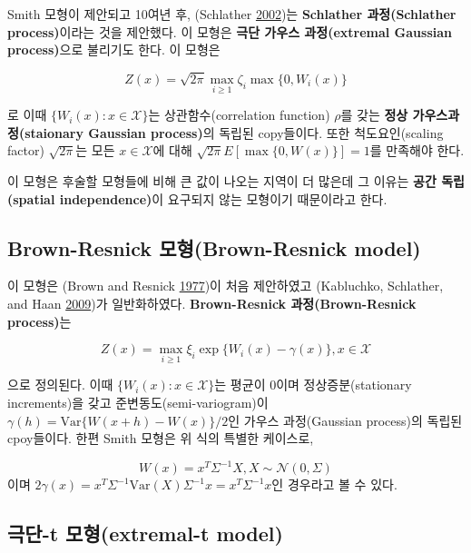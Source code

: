 \documentclass[b5paper,]{book}
\theoremstyle{definition}
\theoremstyle{definition}
\theoremstyle{definition}
\theoremstyle{remark}
\begin{document}
Smith 모형이 제안되고 10여년 후, (Schlather
\protect\hyperlink{ref-Schlather2002}{2002})는 \textbf{Schlather
과정(Schlather process)}이라는 것을 제안했다. 이 모형은 \textbf{극단
가우스 과정(extremal Gaussian process)}으로 불리기도 한다. 이 모형은

\begin{equation}
Z(x)=\sqrt{2\pi}\max_{i\geq 1}\zeta_{i}\max\{0,W_{i}(x)\}
\end{equation}

로 이때 \(\{W_{i}(x): x\in\mathcal{X}\}\)는 상관함수(correlation
function) \(\rho\)를 갖는 \textbf{정상 가우스과정(staionary Gaussian
process)}의 독립된 copy들이다. 또한 척도요인(scaling factor)
\(\sqrt{2\pi}\)는 모든 \(x\in\mathcal{X}\)에 대해
\(\sqrt{2\pi}E[\max\{ 0,W(x)\}]=1\)를 만족해야 한다.

이 모형은 후술할 모형들에 비해 큰 값이 나오는 지역이 더 많은데 그 이유는
\textbf{공간 독립(spatial independence)}이 요구되지 않는 모형이기
때문이라고 한다.

\subsection{Brown-Resnick 모형(Brown-Resnick
model)}\label{brown-resnick-brown-resnick-model}

이 모형은 (Brown and Resnick \protect\hyperlink{ref-Brown1977}{1977})이
처음 제안하였고 (Kabluchko, Schlather, and Haan
\protect\hyperlink{ref-Kabluchko2009a}{2009})가 일반화하였다.
\textbf{Brown-Resnick 과정(Brown-Resnick process)}는

\begin{equation}
Z(x)=\max_{i\geq 1}\xi_{i}\exp\{W_{i}(x)-\gamma(x)\},x\in\mathcal{X}
\end{equation}

으로 정의된다. 이때 \(\{W_{i}(x): x\in\mathcal{X}\}\)는 평균이 0이며
정상증분(stationary increments)을 갖고 준변동도(semi-variogram)이
\(\gamma(h)=\text{Var}\{W(x+h)-W(x)\}/2\)인 가우스 과정(Gaussian
process)의 독립된 cpoy들이다. 한편 Smith 모형은 위 식의 특별한 케이스로,

\[W(x)=x^{T}\Sigma^{-1}X, X\sim\mathcal{N}(0,\Sigma)\] 이며
\(2\gamma(x)=x^{T}\Sigma^{-1}\text{Var}(X)\Sigma^{-1}x=x^{T}\Sigma^{-1}x\)인
경우라고 볼 수 있다.

\subsection{극단-t 모형(extremal-t model)}\label{-t-extremal-t-model}
\end{document}
